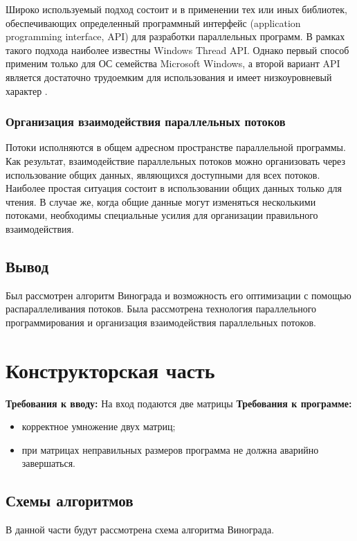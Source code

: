 \documentclass[12pt]{report}
\begin{document}
Широко используемый подход состоит и в применении тех или иных библиотек, обеспечивающих определенный программный интерфейс (application programming interface, API) для разработки параллельных программ. В рамках такого подхода наиболее известны Windows Thread API. Однако первый способ применим только для ОС семейства Microsoft Windows, а второй вариант API является достаточно трудоемким для использования и имеет низкоуровневый характер \cite{Barkalov}.

\subsection{Организация взаимодействия параллельных потоков}
Потоки исполняются в общем адресном пространстве параллельной программы. Как результат, взаимодействие параллельных потоков можно организовать через использование общих данных, являющихся доступными для всех потоков. Наиболее простая ситуация состоит в использовании общих данных только для чтения. В случае же, когда общие данные могут изменяться несколькими потоками, необходимы специальные усилия для организации правильного взаимодействия.


\section{Вывод}
Был рассмотрен алгоритм Винограда и возможность его оптимизации с помощью распараллеливания потоков. Была рассмотрена технология параллельного программирования и
организация взаимодействия параллельных потоков.

\chapter{Конструкторская часть}
\textbf{Требования к вводу:}
На вход подаются две матрицы
\newline
\textbf{Требования к программе:}
\begin{itemize}
	\item корректное умножение двух матриц;
	\item при матрицах неправильных размеров программа не должна аварийно завершаться.
\end{itemize}

\section{Схемы алгоритмов}
В данной части будут рассмотрена схема алгоритма Винограда.
\end{document}
